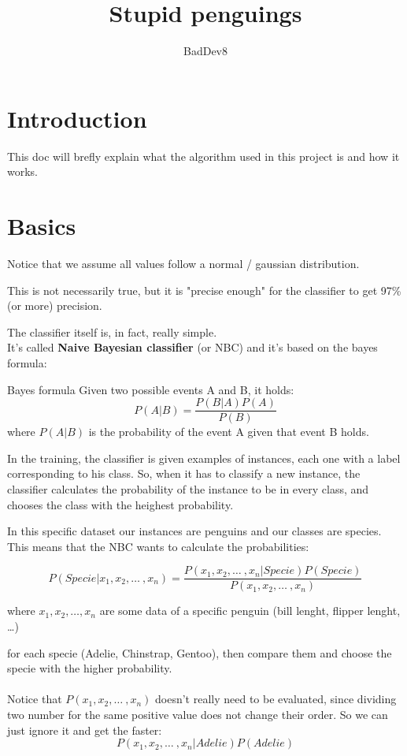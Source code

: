 \documentclass[11pt]{article}
\title{Stupid penguings}
\author{BadDev8}
\newenvironment{tightcenter}{%
    \setlength\topsep{0pt}
    \setlength\parskip{0pt}
    \begin{center}
}{%
    \end{center}
}
\begin{document}
\maketitle

\section*{Introduction}

This doc will brefly explain what the algorithm used in this project is and how
it works.

\section*{Basics}

\begin{warning}
    Notice that we assume all values follow a normal / gaussian distribution.

    This is not necessarily true, but it is "precise enough" for the classifier
    to get 97\% (or more) precision.
\end{warning}

The classifier itself is, in fact, really simple. \\
It's called \textbf{Naive Bayesian classifier} (or NBC) and it's based on the
bayes formula:

\begin{proposition}
    {Bayes formula}{} Given two possible events A and B, it holds:
    \[
        P(A|B) = \frac{P(B|A) P(A)}{P(B)}
    \]
    where $P(A|B)$ is the probability of the event A given that event B holds.
\end{proposition}

In the training, the classifier is given examples of instances, each one with a
label corresponding to his class. So, when it has to classify a new instance,
the classifier calculates the probability of the instance to be in every class,
and chooses the class with the heighest probability.

In this specific dataset our instances are penguins and our classes are species.
This means that the NBC wants to calculate the probabilities:

\[
    P(Specie|x_1,x_2, \dots \ , x_n) = \frac{P(x_1,x_2, \dots \ , x_n|Specie) P(Specie)}{P(x_1,x_2, \dots \ , x_n)}
\]

\begin{tightcenter}
    where $x_1,x_2, \dots , x_n$ are some data of a specific penguin (bill
    lenght, flipper lenght, \dots)
\end{tightcenter}
for each specie (Adelie, Chinstrap, Gentoo), then compare them and choose the
specie with the higher probability. \\
\\
Notice that $P(x_1,x_2, \dots \ , x_n)$ doesn't really need to be evaluated,
since dividing two number for the same positive value does not change their
order. So we can just ignore it and get the faster:
\[
    P(x_1,x_2, \dots \ , x_n|Adelie) P(Adelie)
\]
\end{document}
